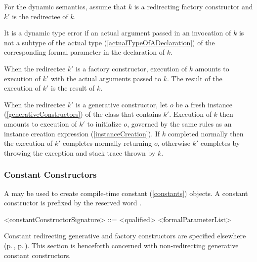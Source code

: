 \documentclass[makeidx]{article}
\begin{document}
\LMHash{}%
For the dynamic semantics,
assume that $k$ is a redirecting factory constructor
and $k'$ is the redirectee of $k$.

\LMHash{}%
It is a dynamic type error if an actual argument passed in an invocation of $k$
is not a subtype of the actual type (\ref{actualTypeOfADeclaration})
of the corresponding formal parameter in the declaration of $k$.

\LMHash{}%
When the redirectee $k'$ is a factory constructor,
execution of $k$ amounts to execution of $k'$ with the actual arguments passed to $k$.
The result of the execution of $k'$ is the result of $k$.

\LMHash{}%
When the redirectee $k'$ is a generative constructor,
let $o$ be a fresh instance (\ref{generativeConstructors})
of the class that contains $k'$.
Execution of $k$ then amounts to execution of $k'$ to initialize $o$,
governed by the same rules as an instance creation expression (\ref{instanceCreation}).
If $k$ completed normally then the execution of $k'$ completes normally returning $o$,
otherwise $k'$ completes by throwing the exception and stack trace thrown by $k$.


\subsubsection{Constant Constructors}

\LMHash{}%
A 
may be used to create compile-time constant (\ref{constants}) objects.
A constant constructor is prefixed by the reserved word \CONST{}.

\begin{grammar}
<constantConstructorSignature> ::= \CONST{} <qualified> <formalParameterList>
\end{grammar}


\LMHash{}%
Constant redirecting generative and factory constructors are specified elsewhere
(p.\,\pageref{redirectingGenerativeConstructors},
p.\,\pageref{redirectingFactoryConstructors}).
This section is henceforth concerned with
non-redirecting generative constant constructors.
\end{document}
